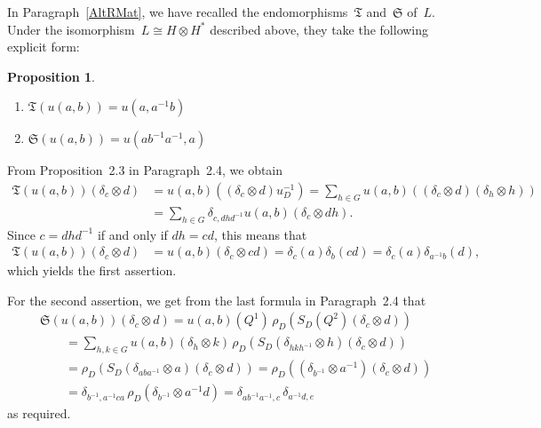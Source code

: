 \documentclass[12pt]{article}
\makeatletter
\newcounter{num}
\theoremstyle{definition}
\newtheorem{Proposition}[Satz]{Proposition}
\theoremstyle{break}
\renewenvironment{proof}[1][\proofname]{\par
\vspace{-5pt}%
\pushQED{\qed}%
\normalfont
\topsep0pt \partopsep0pt %
\trivlist
\item[\hskip\labelsep
\bfseries
#1\@addpunct{.}]\ignorespaces
}{%
\popQED\endtrivlist\@endpefalse
\addvspace{6pt plus 6pt} %
}
\newcommand{\fS}{\mathfrak{S}}
\newcommand{\fT}{\mathfrak{T}}
\renewcommand{\1}{\mathbbm{1}}
\newcommand{\ot}{\mathbin{\otimes}}
\newcommand{\uu}{u}
\makeatother
\begin{document}
In Paragraph~\ref{AltRMat}, we have recalled the endomorphisms~$\fT$ and~$\fS$ of~$L$. Under the isomorphism~$L \cong H \ot H^*$ described above, they take the following explicit form:
\begin{samepage}
\begin{Proposition} \label{FormST}
\begin{enumerate}
\item 
$\fT(\uu(a,b)) = \uu(a,{a^{-1} b})$

\item 
$\fS(\uu(a,b)) = \uu(a b^{-1} a^{-1},a)$
\end{enumerate}
\end{Proposition}
\end{samepage}
\begin{proof}
From Proposition~2.3 in Paragraph~2.4, we obtain
\begin{align*}
\fT(\uu(a,b))(\delta_c \ot d) &= \uu(a,b)((\delta_c \ot d) u_D^{-1})
= \sum_{h \in G} \uu(a,b)((\delta_c \ot d)(\delta_{h} \ot h)) \\
&= \sum_{h \in G} \delta_{c,dhd^{-1}} \uu(a,b)(\delta_c \ot dh).
\end{align*}
Since $c = dhd^{-1}$ if and only if $dh = cd$, this means that
\begin{align*}
\fT(\uu(a,b))(\delta_c \ot d) &= \uu(a,b)(\delta_c \ot cd)
= \delta_c(a) \delta_b(cd) = \delta_c(a) \delta_{a^{-1} b}(d),
\end{align*}
which yields the first assertion. 

For the second assertion, we get from the last formula in Paragraph~2.4 that
\begin{align*}
&\fS(\uu(a,b))(\delta_c \ot d)
= \uu(a,b)(Q^1) \, \rho_D(S_D(Q^2) (\delta_c \ot d)) \\
&\qquad = \sum_{h,k \in G} \uu(a,b)(\delta_{h} \ot k) \,
\rho_D(S_D(\delta_{h k h^{-1}} \ot h)(\delta_c \ot d)) \\
&\qquad = \rho_D(S_D(\delta_{a b a^{-1}} \ot a)(\delta_c \ot d)) 
= \rho_D((\delta_{b^{-1}} \ot a^{-1})(\delta_c \ot d)) \\
&\qquad = \delta_{b^{-1}, a^{-1} c a} \, \rho_D(\delta_{b^{-1}} \ot a^{-1} d)
= \delta_{a b^{-1} a^{-1}, c} \, \delta_{a^{-1} d, e}
\end{align*}
as required.
\end{proof}
\end{document}
